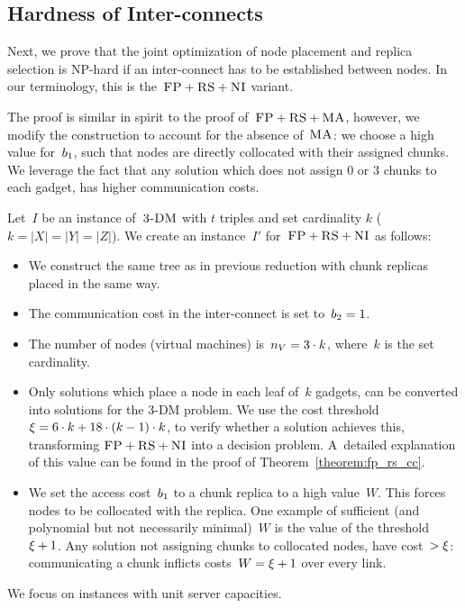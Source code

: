 \subsection{Hardness of Inter-connects}\label{ssec:fprscc}


Next, we prove that the joint optimization of node placement and replica selection
is NP-hard if an inter-connect has to be established between nodes.
In our terminology, this is the~$\textsc{FP}+\textsc{RS}+\textsc{NI}$ variant.

The proof is similar in spirit to the proof of~$\textsc{FP}+\textsc{RS}+\textsc{MA}$, however,
we modify the construction to account for the absence of~$\textsc{MA}$:
we choose
a high value for~$b_1$, such that nodes are directly collocated with
their assigned chunks. We leverage the fact that any solution which does not
assign 0 or 3 chunks to each gadget, has higher communication costs.

Let~$I$ be an instance of~$\textsc{3-DM}$ with $t$ triples and set cardinality $k$ ($k = |X| = |Y| = |Z|$). We create an instance~$I'$
for~$\textsc{FP}+\textsc{RS}+\textsc{NI}$ as follows:
\begin{itemize}
\item We construct the same tree as in previous reduction with
chunk replicas placed in the same way.
\item The communication cost in the inter-connect is set to~$b_2 = 1$.
\item The number of nodes (virtual machines) is~$n_V = 3 \cdot k$, where~$k$ is the set cardinality.
\item Only solutions which place a node in each leaf of~$k$ gadgets, can
be converted into solutions for the 3-DM problem. We use the cost threshold
$\xi =  6 \cdot k + 18 \cdot
(k - 1) \cdot k$, to verify whether a solution achieves this, transforming
$\textsc{FP}+\textsc{RS}+\textsc{NI}$ into a decision problem. A~detailed explanation of this value can
be found in the proof of Theorem~\ref{theorem:fp_rs_cc}.
\item We set the access cost~$b_1$ to a chunk replica to a high value~$W$. This forces
nodes to be collocated with the replica. One example of sufficient
(and polynomial but not necessarily minimal)~$W$
is the value of the threshold~$\xi+1$. Any solution not
assigning chunks to collocated nodes, have cost~$> \xi$:
communicating a chunk inflicts costs~$W=\xi+1$ over every link.
\end{itemize}

We focus on instances with unit server capacities.

